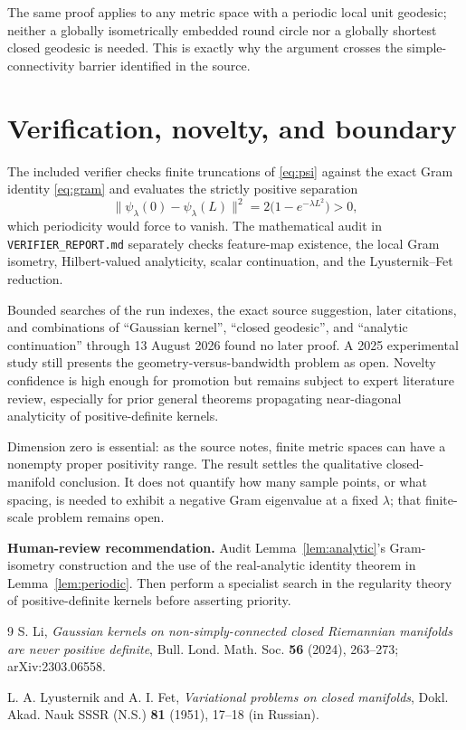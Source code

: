 \documentclass[11pt]{article}
\theoremstyle{remark}
\begin{document}
The same proof applies to any metric space with a periodic local unit
geodesic; neither a globally isometrically embedded round circle nor a
globally shortest closed geodesic is needed.  This is exactly why the
argument crosses the simple-connectivity barrier identified in the source.

\section{Verification, novelty, and boundary}

The included verifier checks finite truncations of \eqref{eq:psi} against the
exact Gram identity \eqref{eq:gram} and evaluates the strictly positive
separation
\[
 \|\psi_\lambda(0)-\psi_\lambda(L)\|^2
 =2\bigl(1-e^{-\lambda L^2}\bigr)>0,
\]
which periodicity would force to vanish.  The mathematical audit in
\texttt{VERIFIER\_REPORT.md} separately checks feature-map existence, the
local Gram isometry, Hilbert-valued analyticity, scalar continuation, and the
Lyusternik--Fet reduction.

Bounded searches of the run indexes, the exact source suggestion, later
citations, and combinations of ``Gaussian kernel'', ``closed geodesic'', and
``analytic continuation'' through 13 August 2026 found no later proof.  A
2025 experimental study still presents the geometry-versus-bandwidth problem
as open.  Novelty confidence is high enough for promotion but remains subject
to expert literature review, especially for prior general theorems propagating
near-diagonal analyticity of positive-definite kernels.

Dimension zero is essential: as the source notes, finite metric spaces can
have a nonempty proper positivity range.  The result settles the qualitative
closed-manifold conclusion.  It does not quantify how many sample points, or
what spacing, is needed to exhibit a negative Gram eigenvalue at a fixed
$\lambda$; that finite-scale problem remains open.

\noindent\textbf{Human-review recommendation.}
Audit Lemma~\ref{lem:analytic}'s Gram-isometry construction and the use of the
real-analytic identity theorem in Lemma~\ref{lem:periodic}.  Then perform a
specialist search in the regularity theory of positive-definite kernels before
asserting priority.

\begin{thebibliography}{9}
S. Li,
\emph{Gaussian kernels on non-simply-connected closed Riemannian manifolds
are never positive definite}, Bull. Lond. Math. Soc. \textbf{56} (2024),
263--273; arXiv:2303.06558.

L. A. Lyusternik and A. I. Fet,
\emph{Variational problems on closed manifolds}, Dokl. Akad. Nauk SSSR
(N.S.) \textbf{81} (1951), 17--18 (in Russian).
\end{thebibliography}
\end{document}
